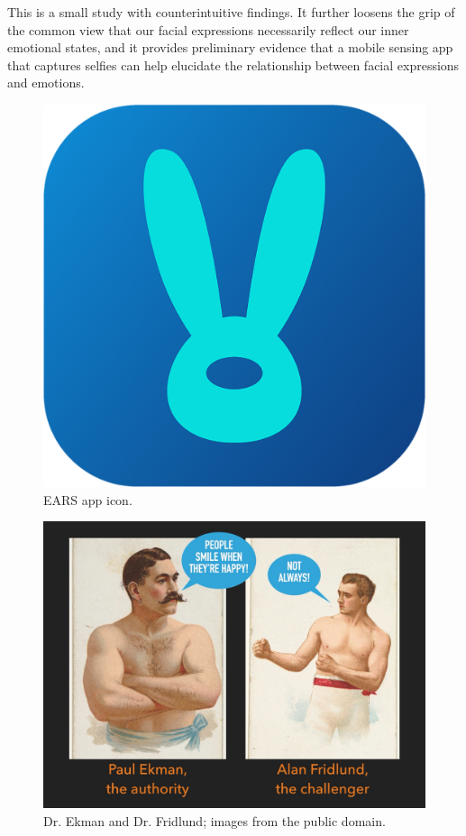 \documentclass[authordate, empirical,issue]{jote-new-article}
\begin{document}
\begin{takeHomeMessage}

  This is a small study with counterintuitive findings. It further loosens the grip of the common view that our facial expressions necessarily reflect our inner emotional states, and it provides preliminary evidence that a mobile sensing app that captures selfies can help elucidate the relationship between facial expressions and emotions.

\end{takeHomeMessage}





\begin{figure}[b]
  \begin{fullwidth}
    \centering
    \includegraphics[width=.5\linewidth]{media/image1.png}

    \caption{EARS app icon.}
  \end{fullwidth}

  \label{fig:rId8}



\end{figure}


\begin{figure}[b!]
  \begin{fullwidth}
    \centering
    \includegraphics[width=.8\linewidth]{media/image2.jpeg}

    \caption{Dr. Ekman and Dr. Fridlund; images from the public domain.}
  \end{fullwidth}

  \label{fig:rId9}


\end{figure}
\end{document}
